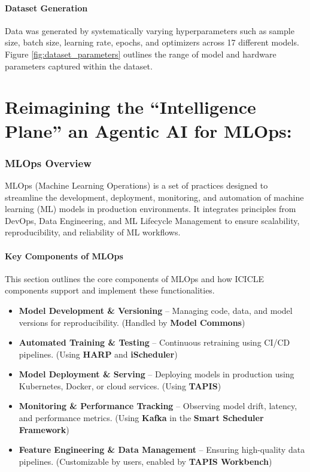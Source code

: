 \paragraph{Dataset Generation}

Data was generated by systematically varying hyperparameters such as sample size, batch size, learning rate, epochs, and optimizers across 17 different models. Figure \ref{fig:dataset_parameters} outlines the range of model and hardware parameters captured within the dataset.


\section {Reimagining the “Intelligence Plane” an Agentic AI for MLOps:}

\subsubsection{MLOps Overview}

MLOps (Machine Learning Operations) is a set of practices designed to streamline the development, deployment, monitoring, and automation of machine learning (ML) models in production environments. It integrates principles from DevOps, Data Engineering, and ML Lifecycle Management to ensure scalability, reproducibility, and reliability of ML workflows.

\paragraph{Key Components of MLOps}
This section outlines the core components of MLOps and how ICICLE components support and implement these functionalities.
\begin{itemize}
    \item \textbf{Model Development \& Versioning} – Managing code, data, and model versions for reproducibility. (Handled by \textbf{Model Commons})
    \item \textbf{Automated Training \& Testing} – Continuous retraining using CI/CD pipelines. (Using \textbf{HARP} and \textbf{iScheduler})
    \item \textbf{Model Deployment \& Serving} – Deploying models in production using Kubernetes, Docker, or cloud services. (Using \textbf{TAPIS})
    \item \textbf{Monitoring \& Performance Tracking} – Observing model drift, latency, and performance metrics. (Using \textbf{Kafka} in the \textbf{Smart Scheduler Framework})
    \item \textbf{Feature Engineering \& Data Management} – Ensuring high-quality data pipelines. (Customizable by users, enabled by \textbf{TAPIS Workbench})
\end{itemize}


